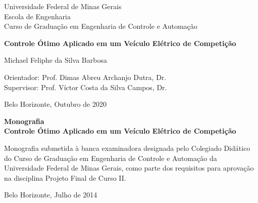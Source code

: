 \begin{titlepage}
	\begin{center}
		{\large Universidade Federal de Minas Gerais\\
			Escola de Engenharia \\
			Curso de Graduação em Engenharia de Controle e Automação\\}

		\vspace{6cm}
		{\bf\Large Controle Ótimo Aplicado em\vspace{0.2cm}
			um Veículo Elétrico de Competição}
		\vspace{4cm}

		{\large Michael Feliphe da Silva Barbosa}
		\vspace{2cm}

		\vspace{2cm}
		{\large Orientador: Prof. Dimas Abreu Archanjo Dutra, Dr.}\\
		{\large Supervisor: Prof. Víctor Costa da Silva Campos, Dr.}

		\vfill
		{\large Belo Horizonte, Outubro de 2020}
	\end{center}

\end{titlepage}

\newpage
\clearpage
\thispagestyle{empty}


\begin{titlepage}

	\centering
	\textbf{Monografia}\\
	\vspace{2cm}
	\centering
	\textbf{Controle Ótimo Aplicado em um Veículo Elétrico de Competição}\\
	\vspace{5cm}

	\parbox{1.0\textwidth}
	{\large
		Monografia submetida à banca examinadora
		designada pelo Colegiado Didático do Curso de
		Graduação em Engenharia de Controle e
		Automação da Universidade Federal de Minas
		Gerais, como parte dos requisitos para aprovação na
		disciplina Projeto Final de Curso II.}

	\vspace{7cm}
	\centering
	Belo Horizonte, Julho de 2014

\end{titlepage}
